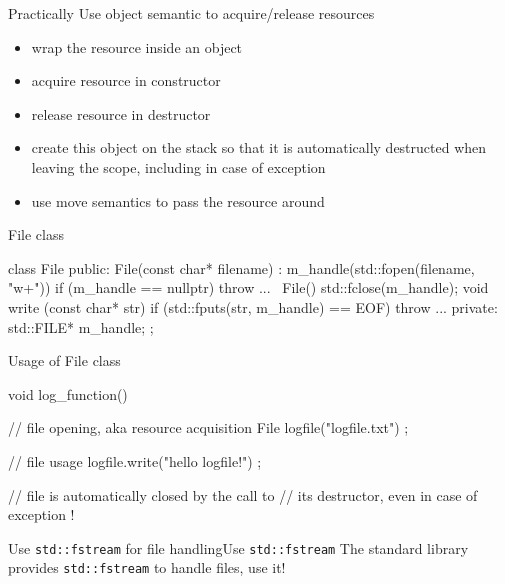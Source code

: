 \begin{frame}
  \begin{block}{Practically}
    Use object semantic to acquire/release resources
    \begin{itemize}
    \item wrap the resource inside an object
    \item acquire resource in constructor
    \item release resource in destructor
    \item create this object on the stack so that it is automatically destructed when leaving the scope, including in case of exception
    \item use move semantics to pass the resource around
    \end{itemize}
  \end{block}
\end{frame}

\begin{frame}[fragile]
  \begin{exampleblock}{File class}
    \begin{cppcode*}{}
      class File {
      public:
        File(const char* filename) :
          m_handle(std::fopen(filename, "w+")) {
          if (m_handle == nullptr) { throw ... }
        }
        ~File() { std::fclose(m_handle); }
        void write (const char* str) {
          if (std::fputs(str, m_handle) == EOF) {
            throw ...
          }
        }
      private:
        std::FILE* m_handle;
      };
    \end{cppcode*}
  \end{exampleblock}
\end{frame}

\begin{frame}[fragile]
  \begin{exampleblock}{Usage of File class}
    \begin{cppcode*}{}
      void log_function() {
        // file opening, aka resource acquisition
        File logfile("logfile.txt") ;

        // file usage
        logfile.write("hello logfile!") ;

        // file is automatically closed by the call to
        // its destructor, even in case of exception !
      }
    \end{cppcode*}
  \end{exampleblock}
  \begin{goodpracticeWithShortcut}{Use \texttt{std::fstream} for file handling}{Use \texttt{std::fstream}}
     The standard library provides \texttt{std::fstream} to handle files, use it!
  \end{goodpracticeWithShortcut}
\end{frame}

